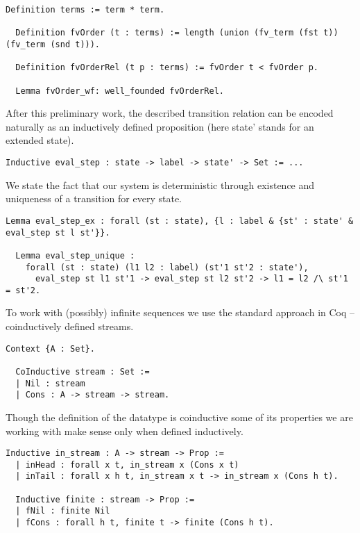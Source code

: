\begin{lstlisting}[language=Coq]
  Definition terms := term * term.

  Definition fvOrder (t : terms) := length (union (fv_term (fst t)) (fv_term (snd t))).

  Definition fvOrderRel (t p : terms) := fvOrder t < fvOrder p.

  Lemma fvOrder_wf: well_founded fvOrderRel.
\end{lstlisting}

After this preliminary work, the described transition relation can be encoded naturally as an inductively defined proposition (here state' stands for an extended state).

\begin{lstlisting}[language=Coq]
  Inductive eval_step : state -> label -> state' -> Set := ...
\end{lstlisting}

We state the fact that our system is deterministic through existence and uniqueness of a transition for every state.

\begin{lstlisting}[language=Coq]
  Lemma eval_step_ex : forall (st : state), {l : label & {st' : state' & eval_step st l st'}}.

  Lemma eval_step_unique :
    forall (st : state) (l1 l2 : label) (st'1 st'2 : state'),
      eval_step st l1 st'1 -> eval_step st l2 st'2 -> l1 = l2 /\ st'1 = st'2.
\end{lstlisting}

To work with (possibly) infinite sequences we use the standard approach in Coq -- coinductively defined streams.

\begin{lstlisting}[language=Coq]
  Context {A : Set}.

  CoInductive stream : Set :=
  | Nil : stream
  | Cons : A -> stream -> stream.
\end{lstlisting}

Though the definition of the datatype is coinductive some of its properties we are working with make sense only when defined inductively.

\begin{lstlisting}[language=Coq]
  Inductive in_stream : A -> stream -> Prop :=
  | inHead : forall x t, in_stream x (Cons x t)
  | inTail : forall x h t, in_stream x t -> in_stream x (Cons h t).

  Inductive finite : stream -> Prop :=
  | fNil : finite Nil
  | fCons : forall h t, finite t -> finite (Cons h t).
\end{lstlisting}

